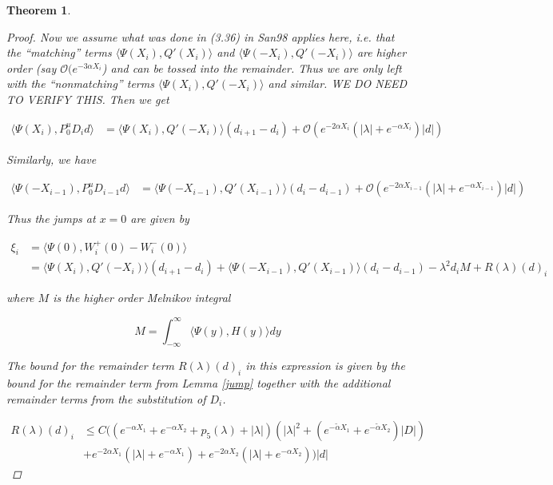 \documentclass[12pt]{article}
\newtheorem{theorem}{Theorem}
\begin{document}
\begin{theorem}
\begin{proof}
Now we assume what was done in (3.36) in San98 applies here, i.e. that the ``matching'' terms $\langle \Psi(X_i), Q'(X_i) \rangle$ and $\langle \Psi(-X_i), Q'(-X_i) \rangle$ are higher order (say $\mathcal{O}(e^{-3 \alpha X_i}$) and can be tossed into the remainder. Thus we are only left with the ``nonmatching'' terms $\langle \Psi(X_i), Q'(-X_i) \rangle$ and similar. WE DO NEED TO VERIFY THIS. Then we get

\begin{align*}
\langle \Psi(X_i), P^u_0 D_i d \rangle &= \langle \Psi(X_i), Q'(-X_i) \rangle (d_{i+1} - d_i ) + \mathcal{O} \left( e^{-2 \alpha X_i} \left( |\lambda| +  e^{-\alpha X_i}  \right) |d| \right)
\end{align*}

Similarly, we have

\begin{align*}
\langle \Psi(-X_{i-1}), P^u_0 D_{i-1} d \rangle &= \langle \Psi(-X_{i-1}), Q'(X_{i-1}) \rangle (d_i - d_{i-1} ) + \mathcal{O} \left( e^{-2 \alpha X_{i-1}} \left( |\lambda| +  e^{-\alpha X_{i-1}}  \right) |d| \right)
\end{align*}

Thus the jumps at $x = 0$ are given by

\begin{align*}
\xi_i &= \langle \Psi(0), W_i^+(0) - W_i^-(0) \rangle \\
&= \langle \Psi(X_i), Q'(-X_i) \rangle (d_{i+1} - d_i ) + \langle \Psi(-X_{i-1}), Q'(X_{i-1}) \rangle (d_i - d_{i-1} ) - \lambda^2 d_i M + R(\lambda)(d)_i
\end{align*}

where $M$ is the higher order Melnikov integral

\[
M = \int_{-\infty}^\infty \langle \Psi(y), H(y) \rangle dy
\]

The bound for the remainder term $R(\lambda)(d)_i$ in this expression is given by the bound for the remainder term from Lemma \ref{jump} together with the additional remainder terms from the substitution of $D_i$.

\begin{align*}
R(\lambda)(d)_i &\leq C \Big( ( e^{-\alpha X_1} + e^{-\alpha X_2} + p_5(\lambda) + |\lambda|  )(|\lambda|^2 + (e^{-\tilde{\alpha}X_1} + e^{-\tilde{\alpha}X_2}) |D|) \\
&+ e^{-2 \alpha X_1}(|\lambda| + e^{-\alpha X_1}) 
+ e^{-2 \alpha X_2}(|\lambda| + e^{-\alpha X_2}) \Big) |d|
\end{align*}


\end{proof}
\end{theorem}
\end{document}
